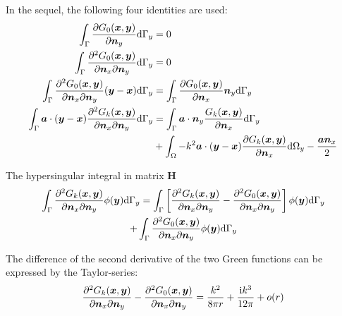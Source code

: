 \documentclass[a4paper, 10pt]{article}
\newcommand{\ti}{\mathrm{i}}
\newcommand{\td}{\mathrm{d}}
\newcommand{\sa}{\bm{\mathnormal{a}}}
\newcommand{\sx}{\bm{\mathnormal{x}}}
\newcommand{\sy}{\bm{\mathnormal{y}}}
\newcommand{\sn}{\bm{\mathnormal{n}}}
\newcommand{\bH}{\mathbf{H}}
\begin{document}
In the sequel, the following four identities are used:
%
%
\begin{align}
	\int_\Gamma \frac{\partial G_0(\sx, \sy)}{\partial \sn_y} \td \Gamma_y & = 0 \\
	\int_\Gamma \frac{\partial^2 G_0(\sx, \sy)}{\partial \sn_x \partial \sn_y} \td \Gamma_y & = 0 \\
	\int_\Gamma \frac{\partial^2 G_0(\sx, \sy)}{\partial \sn_x \partial \sn_y}(\sy - \sx) \td \Gamma_y & = \int_\Gamma \frac{\partial G_0(\sx, \sy)}{\partial \sn_x} \sn_y \td \Gamma_y \\
	\int_\Gamma \sa \cdot (\sy - \sx) \frac{\partial^2 G_k(\sx, \sy)}{\partial \sn_x \partial \sn_y} \td \Gamma_y & = \int_\Gamma \sa \cdot \sn_y \frac{G_k(\sx, \sy)}{\partial \sn_x} \td \Gamma_y \nonumber \\
	& + \int_\Omega - k^2 \sa \cdot (\sy - \sx) \frac{\partial G_k(\sx, \sy)}{\partial \sn_x} \td \Omega_y - \frac{\sa \sn_x}{2}
\end{align}

The hypersingular integral in matrix $\bH$
%
\begin{multline}
	\int_\Gamma \frac{\partial^2 G_k(\sx, \sy)}{\partial \sn_x \partial \sn_y} \phi(\sy) \td \Gamma_y = 
	\int_\Gamma \left[\frac{\partial^2 G_k(\sx, \sy)}{\partial \sn_x \partial \sn_y} - \frac{\partial^2 G_0(\sx, \sy)}{\partial \sn_x \partial \sn_y}\right] \phi(\sy) \td \Gamma_y \\
	+ \int_\Gamma \frac{\partial^2 G_0(\sx, \sy)}{\partial \sn_x \partial \sn_y} \phi(\sy) \td \Gamma_y
\end{multline}

The difference of the second derivative of the two Green functions can be expressed by the Taylor-series:
%
\begin{equation}
	\frac{\partial^2 G_k(\sx, \sy)}{\partial \sn_x \partial \sn_y} - \frac{\partial^2 G_0(\sx, \sy)}{\partial \sn_x \partial \sn_y} = 
	\frac{k^2}{8 \pi r} + \frac{\ti k^3}{12 \pi} + o(r)
\end{equation}
\end{document}
